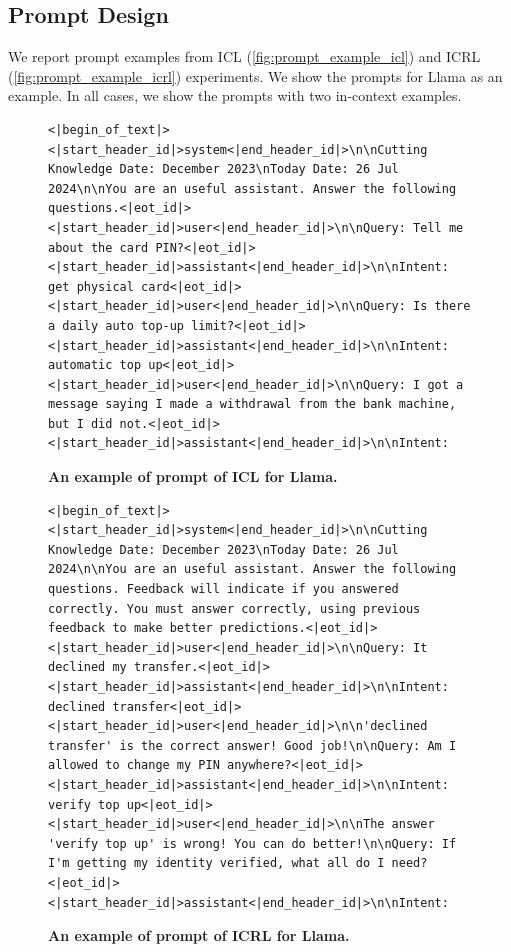 \documentclass{article}
\theoremstyle{plain}
\theoremstyle{definition}
\theoremstyle{remark}
\newcommand{\llama}{Llama\xspace}
\begin{document}
\subsection{Prompt Design}\label{appendix:exp_setup:prompt}
We report prompt examples from ICL (\autoref{fig:prompt_example_icl}) and ICRL (\autoref{fig:prompt_example_icrl}) experiments. We show the prompts for \llama as an example. In all cases, we show the prompts with two in-context examples.
\begin{figure}[ht]
    \centering
    \begin{tcolorbox}[width=0.9\textwidth, fonttitle=\bfseries, title={Prompt example for ICL in \llama}]
\begin{Verbatim}[breaklines=true, breakanywhere=true]
<|begin_of_text|><|start_header_id|>system<|end_header_id|>\n\nCutting Knowledge Date: December 2023\nToday Date: 26 Jul 2024\n\nYou are an useful assistant. Answer the following questions.<|eot_id|><|start_header_id|>user<|end_header_id|>\n\nQuery: Tell me about the card PIN?<|eot_id|><|start_header_id|>assistant<|end_header_id|>\n\nIntent: get physical card<|eot_id|><|start_header_id|>user<|end_header_id|>\n\nQuery: Is there a daily auto top-up limit?<|eot_id|><|start_header_id|>assistant<|end_header_id|>\n\nIntent: automatic top up<|eot_id|><|start_header_id|>user<|end_header_id|>\n\nQuery: I got a message saying I made a withdrawal from the bank machine, but I did not.<|eot_id|><|start_header_id|>assistant<|end_header_id|>\n\nIntent:
\end{Verbatim}
    \end{tcolorbox}
    \caption{\textbf{An example of prompt of ICL for \llama.}}
    \label{fig:prompt_example_icl}
\end{figure}
\begin{figure}[ht]
    \centering
    \begin{tcolorbox}[width=0.9\textwidth, fonttitle=\bfseries, title={Prompt example for ICRL in \llama}]
\begin{Verbatim}[breaklines=true, breakanywhere=true]
<|begin_of_text|><|start_header_id|>system<|end_header_id|>\n\nCutting Knowledge Date: December 2023\nToday Date: 26 Jul 2024\n\nYou are an useful assistant. Answer the following questions. Feedback will indicate if you answered correctly. You must answer correctly, using previous feedback to make better predictions.<|eot_id|><|start_header_id|>user<|end_header_id|>\n\nQuery: It declined my transfer.<|eot_id|><|start_header_id|>assistant<|end_header_id|>\n\nIntent: declined transfer<|eot_id|><|start_header_id|>user<|end_header_id|>\n\n'declined transfer' is the correct answer! Good job!\n\nQuery: Am I allowed to change my PIN anywhere?<|eot_id|><|start_header_id|>assistant<|end_header_id|>\n\nIntent: verify top up<|eot_id|><|start_header_id|>user<|end_header_id|>\n\nThe answer 'verify top up' is wrong! You can do better!\n\nQuery: If I'm getting my identity verified, what all do I need?<|eot_id|><|start_header_id|>assistant<|end_header_id|>\n\nIntent:
\end{Verbatim}
    \end{tcolorbox}
    \caption{\textbf{An example of prompt of ICRL for \llama.}}
    \label{fig:prompt_example_icrl}
\end{figure}
\end{document}
